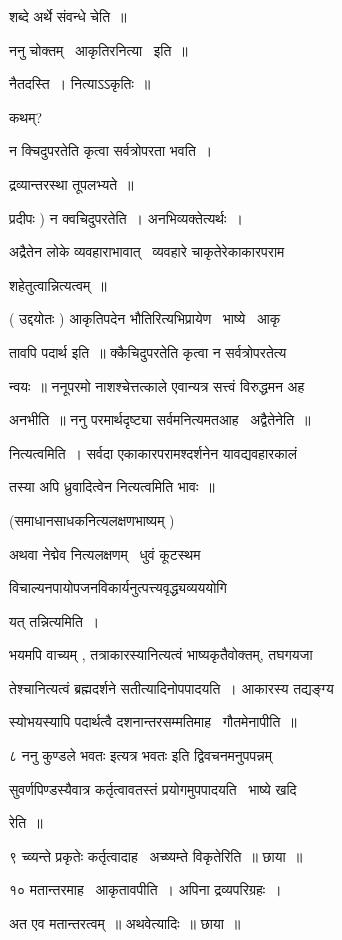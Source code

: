 \documentclass[11pt, openany]{book}
\begin{document}
शब्दे अर्थे संवन्धे चेति~॥ 

ननु चोक्तम् \textendash\ आकृतिरनित्या \textendash\ इति~॥ 

नैतदस्ति~। नित्याऽऽकृतिः~॥ 

कथम्? 

न क्चिदुपरतेति कृत्वा सर्वत्रोपरता भवति~। 

द्रव्यान्तरस्था तूपलभ्यते~॥ 

प्रदीपः ) न क्वचिदुपरतेति~। अनभिव्यक्तेत्यर्थः~। 

अद्रैतेन लोके व्यवहाराभावात् \textendash\ व्यवहारे चाकृतेरेकाकारपराम \textendash\ 

शहेतुत्वान्नित्यत्वम्~॥ 

( उद्दयोतः ) आकृतिपदेन भौतिरित्यभिप्रायेण \textendash\ भाष्ये \textendash\ आकृ \textendash\ 

तावपि पदार्थ इति~॥ क्कैचिदुपरतेति कृत्वा न सर्वत्रोपरतेत्य \textendash\ 

न्वयः~॥ ननूपरमो नाशश्चेत्तत्काले एवान्यत्र सत्त्वं विरुद्धमन अह \textendash\ 

अनभीति~॥ ननु परमार्थदृष्ट्या सर्वमनित्यमतआह \textendash\ अद्वैतेनेति~॥ 

नित्यत्वमिति~। सर्वदा एकाकारपरामश्दर्शनेन यावद्यवहारकालं 

तस्या अपि ध्रुवादित्वेन नित्यत्वमिति भावः~॥ 

(समाधानसाधकनित्यलक्षणभाष्यम् ) 

अथवा नेद्मेव नित्यलक्षणम् \textendash\ धुवं कूटस्थम \textendash\ 

विचाल्यनपायोपजनविकार्यनुत्पत्त्यवृद्ध्यव्यययोगि 

यत् तन्नित्यमिति~। 

भयमपि वाच्यम् , तत्राकारस्यानित्यत्वं भाष्यकृतैवोक्तम्, तघगयजा \textendash\ 

तेश्चानित्यत्वं ब्रह्मदर्शने सतीत्यादिनोपपादयति~। आकारस्य तद्यङ्ग्य \textendash\ 

स्योभयस्यापि पदार्थत्वै दशनान्तरसम्मतिमाह \textendash\ गौतमेनापीति~॥ 

८ {\qt ननु कुण्डले भवतः इत्यत्र भवतः} इति द्विवचनमनुपपन्नम् 

सुवर्णपिण्डस्यैवात्र कर्तृत्वावतस्तं प्रयोगमुपपादयति \textendash\ भाष्ये खदि \textendash\ 

रेति~॥ 

९ च्व्यन्ते प्रकृतेः कर्तृत्वादाह \textendash\ अच्ष्यम्ते विकृतेरिति~॥ छाया~॥ 

१० मतान्तरमाह \textendash\ आकृतावपीति~। अपिना द्रव्यपरिग्रहः~। 

अत एव मतान्तरत्वम्~॥ अथवेत्यादिः~॥ छाया~॥ 
\end{document}
